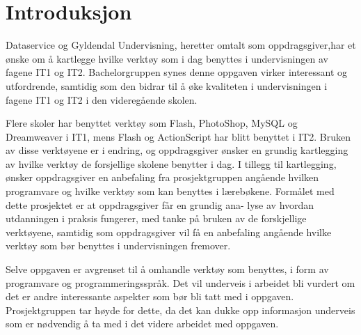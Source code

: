 
\chapter*{Introduksjon}

Dataservice og Gyldendal Undervisning, heretter omtalt som oppdragsgiver,har et ønske om å kartlegge hvilke verktøy som i dag benyttes i undervisningen av fagene IT1 og IT2. Bachelorgruppen synes denne oppgaven virker interessant og utfordrende, samtidig som den bidrar til å øke kvaliteten i undervisningen i fagene IT1 og IT2 i den videregående skolen.\newline


\hspace{-17pt}Flere skoler har benyttet verktøy som Flash, PhotoShop, MySQL og Dreamweaver i IT1, mens Flash og ActionScript har blitt benyttet i IT2. Bruken av disse verktøyene er i endring, og oppdragsgiver ønsker en grundig kartlegging av hvilke verktøy de forsjellige skolene benytter i dag. I tillegg til kartlegging, ønsker oppdragsgiver en anbefaling fra prosjektgruppen angående hvilken programvare og hvilke verktøy som kan benyttes i lærebøkene. Formålet med dette prosjektet er at oppdragsgiver får en grundig ana-
lyse av hvordan utdanningen i praksis fungerer, med tanke på bruken av
de forskjellige verktøyene, samtidig som oppdragsgiver vil få en anbefaling angående hvilke verktøy som bør benyttes i undervisningen fremover. \newline

\hspace{-17pt}Selve oppgaven er avgrenset til å omhandle verktøy som benyttes, i form av programvare og programmeringsspråk. Det vil underveis i arbeidet bli vurdert om det er andre interessante aspekter som bør bli tatt med i oppgaven. Prosjektgruppen tar høyde for dette, da det kan dukke opp informasjon underveis som er nødvendig å ta med i det videre arbeidet med oppgaven.